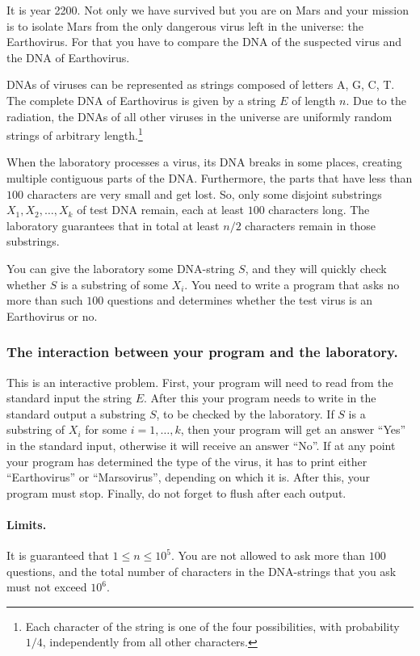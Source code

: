 It is year 2200.
Not only we have survived but you are on Mars and your mission is to isolate Mars from the only dangerous virus left in the universe: the Earthovirus.
For that you have to compare the DNA of the suspected virus and the DNA of Earthovirus.

DNAs of viruses can be represented as strings composed of letters A, G, C, T.
The complete DNA of Earthovirus is given by a string $E$ of length $n$.
Due to the radiation, the DNAs of all other viruses in the universe are uniformly random strings of arbitrary length.\footnote{Each character of the string is one of the four possibilities, with probability $1/4$, independently from all other characters.}

When the laboratory processes a virus, its DNA breaks in some places, creating multiple contiguous parts of the DNA.
Furthermore, the parts that have less than $100$ characters are very small and get lost.
So, only some disjoint substrings $X_1, X_2, \dots, X_k$ of test DNA remain, each at least $100$ characters long.
The laboratory guarantees that in total at least $n / 2$ characters remain in those substrings.

You can give the laboratory some DNA-string $S$, and they will quickly check whether $S$ is a substring of some $X_i$.
You need to write a program that asks no more than such $100$ questions and determines whether the test virus is an Earthovirus or no.

\subsubsection*{The interaction between your program and the laboratory.}
This is an interactive problem.
First, your program will need to read from the standard input the string $E$.
After this your program needs to write in the standard output a substring $S$, to be checked by the laboratory.
If $S$ is a substring of $X_i$ for some $i = 1, \dots, k$, then your program will get an answer ``Yes'' in the standard input, otherwise it will receive an answer ``No''.
If at any point your program has determined the type of the virus, it has to print either ``Earthovirus'' or ``Marsovirus'', depending on which it is.
After this, your program must stop.
Finally, do not forget to flush after each output.

\paragraph{Limits.}
It is guaranteed that $1 \leq n \leq 10^5$.
You are not allowed to ask more than $100$ questions, and the total number of characters in the DNA-strings that you ask must not exceed $10^6$.

{
\renewcommand{\sampleinputname}{Laboratory's feedback}
\renewcommand{\sampleoutputname}{Your questions}
}
